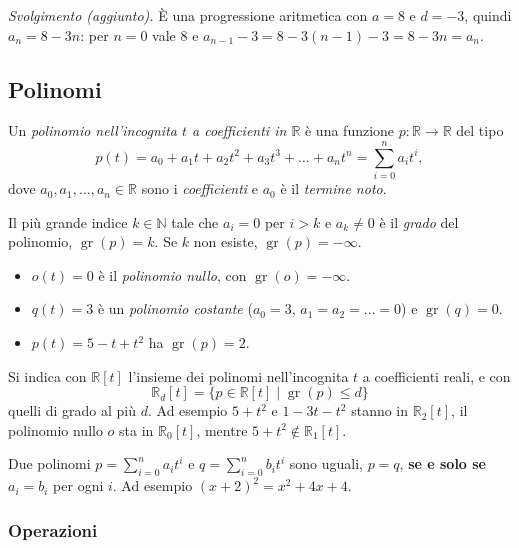 \documentclass[11pt,a4paper]{article}
\begin{document}
\emph{Svolgimento (aggiunto).} È una progressione aritmetica con $a = 8$ e
$d = -3$, quindi $a_n = 8 - 3n$: per $n = 0$ vale $8$ e
$a_{n-1} - 3 = 8 - 3(n-1) - 3 = 8 - 3n = a_n$.

\subsection{Polinomi}

\begin{definizione}
Un \emph{polinomio nell'incognita $t$ a coefficienti in $\mathbb{R}$} è una
funzione $p \colon \mathbb{R} \to \mathbb{R}$ del tipo
\[
  p(t) = a_0 + a_1 t + a_2 t^2 + a_3 t^3 + \dots + a_n t^n
       = \sum_{i=0}^{n} a_i t^i ,
\]
dove $a_0, a_1, \dots, a_n \in \mathbb{R}$ sono i \emph{coefficienti} e $a_0$ è
il \emph{termine noto}.

Il più grande indice $k \in \mathbb{N}$ tale che $a_i = 0$ per $i > k$ e
$a_k \neq 0$ è il \emph{grado} del polinomio, $\operatorname{gr}(p) = k$. Se
$k$ non esiste, $\operatorname{gr}(p) = -\infty$.
\end{definizione}

\begin{esempio}
\begin{itemize}
    \item $o(t) = 0$ è il \emph{polinomio nullo}, con
          $\operatorname{gr}(o) = -\infty$.
    \item $q(t) = 3$ è un \emph{polinomio costante}
          ($a_0 = 3$, $a_1 = a_2 = \dots = 0$) e $\operatorname{gr}(q) = 0$.
    \item $p(t) = 5 - t + t^2$ ha $\operatorname{gr}(p) = 2$.
\end{itemize}
\end{esempio}

Si indica con $\mathbb{R}[t]$ l'insieme dei polinomi nell'incognita $t$ a
coefficienti reali, e con
\[
  \mathbb{R}_d[t] = \{ p \in \mathbb{R}[t] \mid \operatorname{gr}(p) \leq d \}
\]
quelli di grado al più $d$. Ad esempio $5 + t^2$ e $1 - 3t - t^2$ stanno in
$\mathbb{R}_2[t]$, il polinomio nullo $o$ sta in $\mathbb{R}_0[t]$, mentre
$5 + t^2 \notin \mathbb{R}_1[t]$.

\begin{osservazione}
Due polinomi $p = \sum_{i=0}^{n} a_i t^i$ e $q = \sum_{i=0}^{n} b_i t^i$ sono
uguali, $p = q$, \textbf{se e solo se} $a_i = b_i$ per ogni $i$. Ad esempio
$(x+2)^2 = x^2 + 4x + 4$.
\end{osservazione}

\subsubsection{Operazioni}
\end{document}

